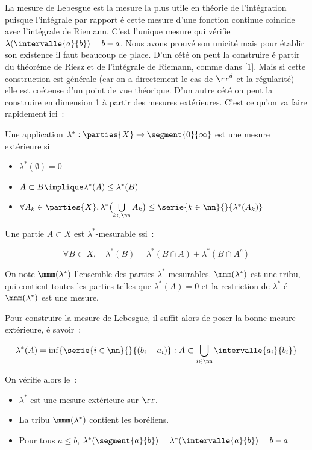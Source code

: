 La mesure de Lebesgue est la mesure la plus utile en théorie de l'intégration puisque l'intégrale par rapport é cette mesure d'une
fonction continue coincide avec l'intégrale de Riemann. C'est l'unique mesure qui vérifie $\lambda(\intervalle{a}{b}) = b-a$. Nous
avons prouvé son unicité mais pour établir son existence il faut beaucoup de place. D'un cété on peut la construire é partir du
théoréme de Riesz et de l'intégrale de Riemann, comme dans $\lbrack 1\rbrack$. Mais si cette construction est générale (car on a 
directement le cas de ${\rr}^d$ et la régularité) elle est coéteuse d'un point de vue théorique. D'un autre cété on peut la construire
en dimension 1 à partir des mesures extérieures. C'est ce qu'on va faire rapidement ici~:\par
{}
Une application $\lambda^* : \parties{X}\to\segment{0}{\infty}$ est une mesure extérieure si\par
\begin{itemize}
\item{} $\lambda^*(\emptyset) = 0$
\item{} $A\subset B\implique \lambda^*(A)\leq \lambda^*(B)$
\item{} $\forall A_k\in\parties{X}, \lambda^*\bigl(\bigcup\limits_{k\in \nn} A_k\bigr)\leq \serie{k\in \nn}{}{\lambda^*(A_k)}$
\end{itemize}\par
{}
Une partie $A\subset X$ est $\lambda^*$-mesurable ssi~:\par
$$\forall B\subset X,\quad \lambda^*(B) = \lambda^*(B\cap A) + \lambda^* (B\cap A^c)$$\par
On note $\mmm(\lambda^*)$ l'ensemble des parties $\lambda^*$-mesurables.
\prop{} $\mmm(\lambda^*)$ est une tribu, qui contient toutes les parties telles que $\lambda^*(A) = 0$ et la restriction
de $\lambda^*$ é $\mmm(\lambda^*)$ est une mesure.\par
Pour construire la mesure de Lebesgue, il suffit alors de poser la bonne mesure extérieure, é savoir~:\par
$$\lambda^*(A) = \inf\lbrace \serie{i\in \nn}{}{(b_i-a_i)} : A\subset \bigcup\limits_{i\in \nn} \intervalle{a_i}{b_i}\rbrace$$\par
On vérifie alors le~:\par
\theoreme{} \begin{itemize}
\item{}  $\lambda^*$ est une mesure extérieure sur $\rr$.
\item{} La tribu $\mmm(\lambda^*)$ contient les boréliens.
\item{} Pour tous $a\leq b$, $\lambda^*(\segment{a}{b}) = \lambda^*(\intervalle{a}{b}) = b-a$
\end{itemize}
